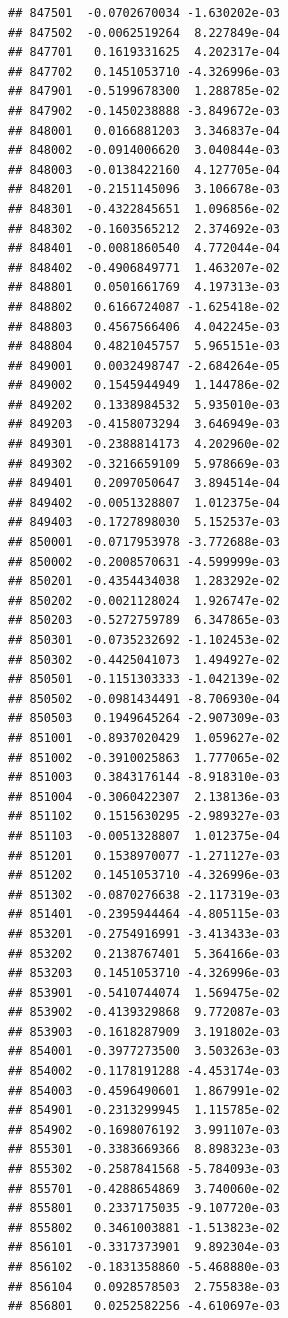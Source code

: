 \documentclass[ignorenonframetext,]{beamer}
\begin{document}
\begin{frame}[fragile]
\begin{verbatim}
## 847501  -0.0702670034 -1.630202e-03
## 847502  -0.0062519264  8.227849e-04
## 847701   0.1619331625  4.202317e-04
## 847702   0.1451053710 -4.326996e-03
## 847901  -0.5199678300  1.288785e-02
## 847902  -0.1450238888 -3.849672e-03
## 848001   0.0166881203  3.346837e-04
## 848002  -0.0914006620  3.040844e-03
## 848003  -0.0138422160  4.127705e-04
## 848201  -0.2151145096  3.106678e-03
## 848301  -0.4322845651  1.096856e-02
## 848302  -0.1603565212  2.374692e-03
## 848401  -0.0081860540  4.772044e-04
## 848402  -0.4906849771  1.463207e-02
## 848801   0.0501661769  4.197313e-03
## 848802   0.6166724087 -1.625418e-02
## 848803   0.4567566406  4.042245e-03
## 848804   0.4821045757  5.965151e-03
## 849001   0.0032498747 -2.684264e-05
## 849002   0.1545944949  1.144786e-02
## 849202   0.1338984532  5.935010e-03
## 849203  -0.4158073294  3.646949e-03
## 849301  -0.2388814173  4.202960e-02
## 849302  -0.3216659109  5.978669e-03
## 849401   0.2097050647  3.894514e-04
## 849402  -0.0051328807  1.012375e-04
## 849403  -0.1727898030  5.152537e-03
## 850001  -0.0717953978 -3.772688e-03
## 850002  -0.2008570631 -4.599999e-03
## 850201  -0.4354434038  1.283292e-02
## 850202  -0.0021128024  1.926747e-02
## 850203  -0.5272759789  6.347865e-03
## 850301  -0.0735232692 -1.102453e-02
## 850302  -0.4425041073  1.494927e-02
## 850501  -0.1151303333 -1.042139e-02
## 850502  -0.0981434491 -8.706930e-04
## 850503   0.1949645264 -2.907309e-03
## 851001  -0.8937020429  1.059627e-02
## 851002  -0.3910025863  1.777065e-02
## 851003   0.3843176144 -8.918310e-03
## 851004  -0.3060422307  2.138136e-03
## 851102   0.1515630295 -2.989327e-03
## 851103  -0.0051328807  1.012375e-04
## 851201   0.1538970077 -1.271127e-03
## 851202   0.1451053710 -4.326996e-03
## 851302  -0.0870276638 -2.117319e-03
## 851401  -0.2395944464 -4.805115e-03
## 853201  -0.2754916991 -3.413433e-03
## 853202   0.2138767401  5.364166e-03
## 853203   0.1451053710 -4.326996e-03
## 853901  -0.5410744074  1.569475e-02
## 853902  -0.4139329868  9.772087e-03
## 853903  -0.1618287909  3.191802e-03
## 854001  -0.3977273500  3.503263e-03
## 854002  -0.1178191288 -4.453174e-03
## 854003  -0.4596490601  1.867991e-02
## 854901  -0.2313299945  1.115785e-02
## 854902  -0.1698076192  3.991107e-03
## 855301  -0.3383669366  8.898323e-03
## 855302  -0.2587841568 -5.784093e-03
## 855701  -0.4288654869  3.740060e-02
## 855801   0.2337175035 -9.107720e-03
## 855802   0.3461003881 -1.513823e-02
## 856101  -0.3317373901  9.892304e-03
## 856102  -0.1831358860 -5.468880e-03
## 856104   0.0928578503  2.755838e-03
## 856801   0.0252582256 -4.610697e-03

\end{verbatim}
\end{frame}
\end{document}
